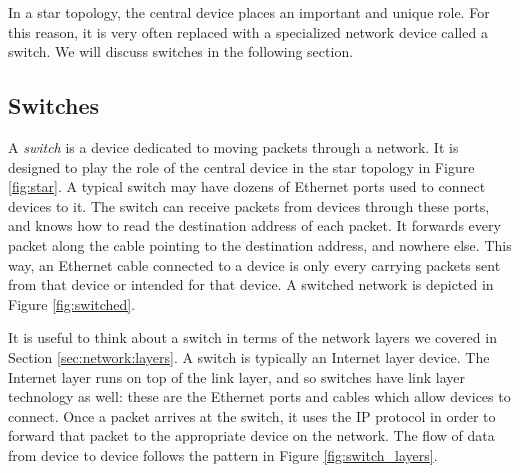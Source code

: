 In a star topology, the central device places an important and unique role. For this reason, it is very often replaced with a specialized network device called a switch. We will discuss switches in the following section.

\subsection{Switches}

A \emph{switch} is a device dedicated to moving packets through a network. It is designed to play the role of the central device in the star topology in Figure \ref{fig:star}. A typical switch may have dozens of Ethernet ports used to connect devices to it. The switch can receive packets from devices through these ports, and knows how to read the destination address of each packet. It forwards every packet along the cable pointing to the destination address, and nowhere else. This way, an Ethernet cable connected to a device is only every carrying packets sent from that device or intended for that device. A switched network is depicted in Figure \ref{fig:switched}.

It is useful to think about a switch in terms of the network layers we covered in Section \ref{sec:network:layers}. A switch is typically an Internet layer device. The Internet layer runs on top of the link layer, and so switches have link layer technology as well: these are the Ethernet ports and cables which allow devices to connect. Once a packet arrives at the switch, it uses the IP protocol in order to forward that packet to the appropriate device on the network. The flow of data from device to device follows the pattern in Figure \ref{fig:switch_layers}.

